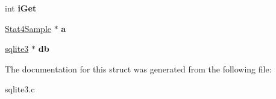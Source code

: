 \begin{DoxyCompactItemize}
\item 
int {\bfseries i\+Get}\hypertarget{structStat4Accum_aee70ce1c45daa00581265d27337bce5e}{}\label{structStat4Accum_aee70ce1c45daa00581265d27337bce5e}

\item 
\hyperlink{structStat4Sample}{Stat4\+Sample} $\ast$ {\bfseries a}\hypertarget{structStat4Accum_a921a2a1d92fe8113626bde517d004278}{}\label{structStat4Accum_a921a2a1d92fe8113626bde517d004278}

\item 
\hyperlink{structsqlite3}{sqlite3} $\ast$ {\bfseries db}\hypertarget{structStat4Accum_af0ae3ddd7a24a925ebe090db6f06a12b}{}\label{structStat4Accum_af0ae3ddd7a24a925ebe090db6f06a12b}

\end{DoxyCompactItemize}


The documentation for this struct was generated from the following file\+:\begin{DoxyCompactItemize}
\item 
sqlite3.\+c\end{DoxyCompactItemize}
